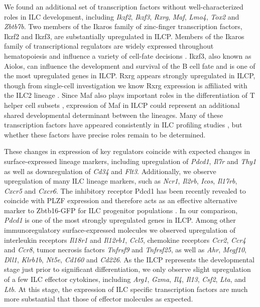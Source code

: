 We found an additional set of transcription factors without well-characterized roles in ILC development, including \textit{Ikzf2}, \textit{Ikzf3}, \textit{Rxrg}, \textit{Maf}, \textit{Lmo4}, \textit{Tox2} and \textit{Zbtb7b}. Two members of the Ikaros family of zinc-finger transcription factors, Ikzf2 and Ikzf3, are substantially upregulated in ILCP. Members of the Ikaros family of transcriptional regulators are widely expressed throughout hematopoiesis and influence a variety of cell-fate decisions \cite{John2011}. Ikzf3, also known as Aiolos, can influence the development and survival of the B cell fate and is one of the most upregulated genes in ILCP. Rxrg appears strongly upregulated in ILCP, though from single-cell investigation we know Rxrg expression is affiliated with the ILC2 lineage \cite{ishizuka2016}. Since Maf also plays important roles in the differentiation of T helper cell subsets \cite{macian2005}, expression of Maf in ILCP could represent an additional shared developmental determinant between the lineages. Many of these transcription factors have appeared consistently in ILC profiling studies \cite{seillet2016,constantinides2015,ishizuka2016,seehus2015}, but whether these factors have precise roles remain to be determined. 

These changes in expression of key regulators coincide with expected changes in surface-expressed lineage markers, including upregulation of \textit{Pdcd1}, \textit{Il7r} and \textit{Thy1} as well as downregulation of \textit{Cd34} and \textit{Flt3}. Additionally, we observe upregulation of many ILC lineage markers, such as \textit{Ncr1}, \textit{Il2rb}, \textit{Icos}, \textit{Il17rb}, \textit{Cxcr5} and \textit{Cxcr6}. The inhibitory receptor Pdcd1 has been recently revealed to coincide with PLZF expression and therefore acts as an effective alternative marker to Zbtb16-GFP for ILC progenitor populations \cite{yu2016}. In our comparison, \textit{Pdcd1} is one of the most strongly upregulated genes in ILCP. Among other immunoregulatory surface-expressed molecules we observed upregulation of interleukin receptors \textit{Il18r1} and \textit{Il12rb1}, \textit{Ccl5}, chemokine receptors \textit{Ccr2}, \textit{Ccr4} and \textit{Ccr8}, tumor necrosis factors \textit{Tnfrsf9} and \textit{Tnfrsf25}, as well as \textit{Ahr}, \textit{Megf10}, \textit{Dll1}, \textit{Klrb1b}, \textit{Nt5e}, \textit{Cd160} and \textit{Cd226}. As the ILCP represents the developmental stage just prior to significant differentiation, we only observe slight upregulation of a few ILC effector cytokines, including \textit{Arg1}, \textit{Gzma}, \textit{Il4}, \textit{Il13}, \textit{Csf2}, \textit{Lta}, and \textit{Ltb}. At this stage, the expression of ILC specific transcription factors are much more substantial that those of effector molecules as expected.

